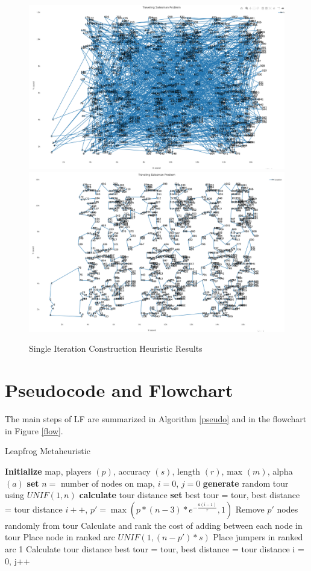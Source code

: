 \documentclass[12pt,letterpaper,oneside]{book}
\begin{document}
 \begin{figure}[H]
 	\centering
 	\includegraphics[width=.85\linewidth]{oneshotbefore.png}
 	\includegraphics[width=.85\linewidth]{oneshotafter.png}
 	\caption{Single Iteration Construction Heuristic Results}
 	\label{oneshot}
 \end{figure}
\section{Pseudocode and Flowchart}
The main steps of LF are summarized in Algorithm \ref{pseudo} and in the flowchart in Figure \ref{flow}.
	\begin{algorithm}[H]
		\caption{Leapfrog Metaheuristic}
		\label{pseudo}
		\begin{algorithmic}[1] 
			\State \textbf{Initialize} map, players $ (p) $, accuracy $ (s) $, length $ (r) $, max $ (m) $, alpha $ (a) $
			\State \textbf{set} $ n= $ number of nodes on map, $ i=0 $, $ j=0 $
			\State \textbf{generate} random tour using $ UNIF(1,n) $
			\State \textbf{calculate} tour distance
			\State \textbf{set} best tour = tour, best distance = tour distance
			\State $ i++ $, $ p' = \max(p*(n-3)*e^{-\frac{a(i-1)}{r}},1) $
			\State Remove $ p' $ nodes randomly from tour
			\State Calculate and rank the cost of adding between each node in tour
			\State Place node in ranked arc $ UNIF(1,(n-p')*s) $
			\Else
			\State Place jumpers in ranked arc 1
			\EndIf
			\EndFor
			\State Calculate tour distance
			\State best tour = tour, best distance = tour distance
			\EndIf
			\State i = 0, j++
			\EndIf
			\EndWhile
		\end{algorithmic}
	\end{algorithm}
\end{document}
